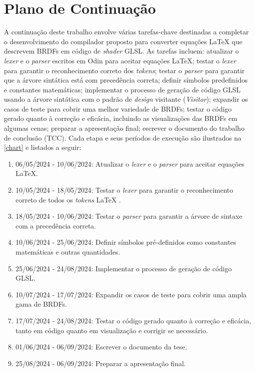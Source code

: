 

\section{Plano de Continuação} \label{continuacao}


A continuação deste trabalho envolve várias tarefas-chave destinadas a completar o desenvolvimento do compilador proposto para converter equações \LaTeX{}  que descrevem BRDFs em código de \textit{shader} GLSL. As tarefas incluem: atualizar o \textit{lexer} e o \textit{parser} escritos em Odin para aceitar equações \LaTeX{}; testar o \textit{lexer} para garantir o reconhecimento correto dos \textit{tokens}; testar o \textit{parser} para garantir que a árvore sintática está com precedência correta; definir símbolos predefinidos e constantes matemáticas; implementar o processo de geração de código GLSL usando a árvore sintática com o padrão de \textit{design} visitante (\textit{Visitor}); expandir os casos de teste para cobrir uma melhor variedade de BRDFs; testar o código gerado quanto à correção e eficácia, incluindo as visualizações das BRDFs em algumas cenas; preparar a apresentação final; escrever o documento do trabalho de conclusão (TCC). Cada etapa e seus períodos de execução são ilustrados na \autoref{chart} e listados a seguir:


\begin{enumerate}
    \item 06/05/2024 - 10/06/2024: Atualizar o \textit{lexer} e o \textit{parser} para aceitar equações \LaTeX{}.
    \item 10/05/2024 - 18/05/2024: Testar o \textit{lexer} para garantir o reconhecimento correto de todos os \textit{tokens} \LaTeX{} .
\item 18/05/2024 - 10/06/2024: Testar o \textit{parser} para garantir a árvore de sintaxe com a precedência correta.
\item 10/06/2024 - 25/06/2024: Definir símbolos pré-definidos como constantes matemáticas e outras quantidades.
\item 25/06/2024 - 24/08/2024: Implementar o processo de geração de código GLSL.
\item 10/07/2024 - 17/07/2024: Expandir os casos de teste para cobrir uma ampla gama de BRDFs.
\item 17/07/2024 - 24/08/2024: Testar o código gerado quanto à correção e eficácia, tanto em código quanto em visualização e corrigir se necessário.
\item 01/06/2024 - 06/09/2024: Escrever o documento da tese.
\item 25/08/2024 - 06/09/2024: Preparar a apresentação final.
\end{enumerate}


